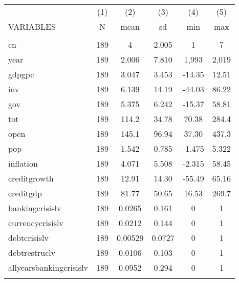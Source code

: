 \documentclass[]{article}
\begin{document}
\begin{tabular}{lccccc} \hline
 & (1) & (2) & (3) & (4) & (5) \\
VARIABLES & N & mean & sd & min & max \\ \hline
 &  &  &  &  &  \\
cn & 189 & 4 & 2.005 & 1 & 7 \\
year & 189 & 2,006 & 7.810 & 1,993 & 2,019 \\
gdpgpc & 189 & 3.047 & 3.453 & -14.35 & 12.51 \\
inv & 189 & 6.139 & 14.19 & -44.03 & 86.22 \\
gov & 189 & 5.375 & 6.242 & -15.37 & 58.81 \\
tot & 189 & 114.2 & 34.78 & 70.38 & 284.4 \\
open & 189 & 145.1 & 96.94 & 37.30 & 437.3 \\
pop & 189 & 1.542 & 0.785 & -1.475 & 5.322 \\
inflation & 189 & 4.071 & 5.508 & -2.315 & 58.45 \\
creditgrowth & 189 & 12.91 & 14.30 & -55.49 & 65.16 \\
creditgdp & 189 & 81.77 & 50.65 & 16.53 & 269.7 \\
bankingcrisislv & 189 & 0.0265 & 0.161 & 0 & 1 \\
currencycrisislv & 189 & 0.0212 & 0.144 & 0 & 1 \\
debtcrisislv & 189 & 0.00529 & 0.0727 & 0 & 1 \\
debtrestruclv & 189 & 0.0106 & 0.103 & 0 & 1 \\
allyearsbankingcrisislv & 189 & 0.0952 & 0.294 & 0 & 1 \\
 &  &  &  &  &  \\ \hline
\end{tabular}
\end{document}
